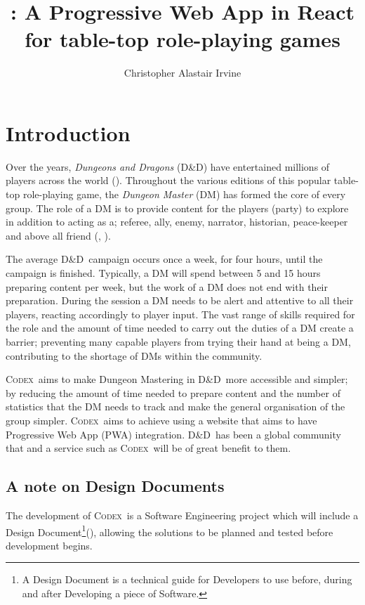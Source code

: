 \documentclass[final]{cmpreport}
\title{\Codex: A Progressive Web App in React for table-top role-playing games}
\author{Christopher Alastair Irvine}
\newcommand{\dnd}{D\&D}
\newcommand{\Codex}{\textsc{Codex}}
\begin{document}
	\section{Introduction} \label{intro}
	Over the years, \emph{Dungeons and Dragons} (\dnd) have entertained millions of players across the world (\cite{DnDOriginal}). Throughout the various editions of this popular table-top role-playing game, the \emph{Dungeon Master} (DM) has formed the core of every group. The role of a DM is to provide content for the players (party) to explore in addition to acting as a; referee, ally, enemy, narrator, historian, peace-keeper and above all friend (\cite{DnDPeople}, \cite{DungeonMaster}). 
	
	The average \dnd \ campaign occurs once a week, for four hours, until the campaign is finished. Typically, a DM will spend between 5 and 15 hours preparing content per week, but the work of a DM does not end with their preparation. During the session a DM needs to be alert and attentive to all their players, reacting accordingly to player input. The vast range of skills required for the role and the amount of time needed to carry out the duties of a DM create a  barrier; preventing many capable players from trying their hand at being a DM, contributing to the shortage of DMs within the community.
			
	\Codex \ aims to make Dungeon Mastering in \dnd \ more accessible and simpler; by reducing the amount of time needed to prepare content and the number of statistics that the DM needs to track and make the general organisation of the group simpler. \Codex \ aims to achieve using a website that aims to have Progressive Web App (PWA) integration. \dnd \ has been a global community that and a service such as \Codex \ will be of great benefit to them. 
	
	\subsection{A note on Design Documents}
	The development of \Codex \ is a Software Engineering project which will include a Design Document\footnote{A Design Document is a technical guide for Developers to use before, during and after Developing a piece of Software.}(\cite{DesignDocExample}), allowing the solutions to be planned and tested before development begins.
	
\end{document}

